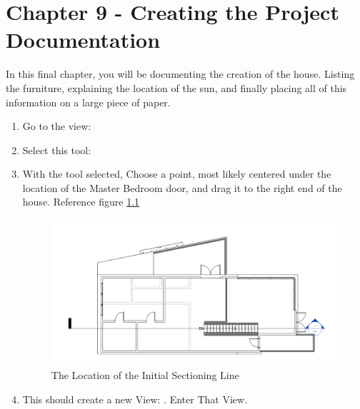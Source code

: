 \documentclass{tufte-book} %
\begin{document}
\chapter{Chapter 9 - Creating the Project Documentation}
\label{ch:9}
In this final chapter, you will be documenting the creation of the house. Listing the furniture, explaining the location of the sun, and finally placing all of this information on a large piece of paper.
\begin{enumerate}
\section{Creating Section Views}
	\item Go to the view: 
	\item Select this tool: 
	\item With the tool selected, Choose a point, most likely centered under the location of the Master Bedroom door, and drag it to the right end of the house. Reference figure \ref{fig:revsectioninit}

	\begin{figure}
		\includegraphics[width=\linewidth]{revitsectionintial.png}
		\caption{The Location of the Initial Sectioning Line}
		\label{fig:revsectioninit}
	\end{figure}
	
	\item This should create a new View: . Enter That View.
	

\end{enumerate}
\end{document}
